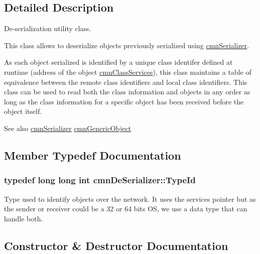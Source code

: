 \subsection{Detailed Description}
De-\/serialization utility class.

This class allows to deserialize objects previously serialized using \hyperlink{classcmn_serializer}{cmn\+Serializer}. 

As each object serialized is identified by a unique class identifer defined at runtime (address of the object \hyperlink{classcmn_class_services}{cmn\+Class\+Services}), this class maintains a table of equivalence between the remote class identifiers and local class identifiers. This class can be used to read both the class information and objects in any order as long as the class information for a specific object has been received before the object itself.

\begin{DoxySeeAlso}{See also}
\hyperlink{classcmn_serializer}{cmn\+Serializer} \hyperlink{classcmn_generic_object}{cmn\+Generic\+Object} 
\end{DoxySeeAlso}


\subsection{Member Typedef Documentation}
\hypertarget{classcmn_de_serializer_aa4c89a09461da0a62a6cc4a29dfdd3c2}{}
\subsubsection[{Type\+Id}]{\setlength{\rightskip}{0pt plus 5cm}typedef long long int {\bf cmn\+De\+Serializer\+::\+Type\+Id}}\label{classcmn_de_serializer_aa4c89a09461da0a62a6cc4a29dfdd3c2}
Type used to identify objects over the network. It uses the services pointer but as the sender or receiver could be a 32 or 64 bits O\+S, we use a data type that can handle both. 

\subsection{Constructor \& Destructor Documentation}
\hypertarget{classcmn_de_serializer_adf60bd67f459b34a40ee529f4070a274}{}
